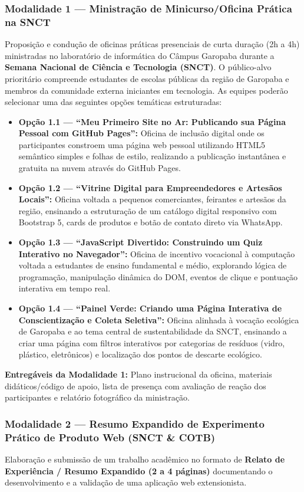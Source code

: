 \documentclass[12pt,a4paper]{article}
\begin{document}
\subsubsection*{Modalidade 1 — Ministração de Minicurso/Oficina Prática na SNCT}
Proposição e condução de oficinas práticas presenciais de curta duração (2h a 4h) ministradas no laboratório de informática do Câmpus Garopaba durante a \textbf{Semana Nacional de Ciência e Tecnologia (SNCT)}. O público-alvo prioritário compreende estudantes de escolas públicas da região de Garopaba e membros da comunidade externa iniciantes em tecnologia. As equipes poderão selecionar uma das seguintes opções temáticas estruturadas:

\begin{itemize}[leftmargin=*]
    \item \textbf{Opção 1.1 — ``Meu Primeiro Site no Ar: Publicando sua Página Pessoal com GitHub Pages'':} Oficina de inclusão digital onde os participantes constroem uma página web pessoal utilizando HTML5 semântico simples e folhas de estilo, realizando a publicação instantânea e gratuita na nuvem através do GitHub Pages.
    \item \textbf{Opção 1.2 — ``Vitrine Digital para Empreendedores e Artesãos Locais'':} Oficina voltada a pequenos comerciantes, feirantes e artesãos da região, ensinando a estruturação de um catálogo digital responsivo com Bootstrap 5, cards de produtos e botão de contato direto via WhatsApp.
    \item \textbf{Opção 1.3 — ``JavaScript Divertido: Construindo um Quiz Interativo no Navegador'':} Oficina de incentivo vocacional à computação voltada a estudantes de ensino fundamental e médio, explorando lógica de programação, manipulação dinâmica do DOM, eventos de clique e pontuação interativa em tempo real.
    \item \textbf{Opção 1.4 — ``Painel Verde: Criando uma Página Interativa de Conscientização e Coleta Seletiva'':} Oficina alinhada à vocação ecológica de Garopaba e ao tema central de sustentabilidade da SNCT, ensinando a criar uma página com filtros interativos por categorias de resíduos (vidro, plástico, eletrônicos) e localização dos pontos de descarte ecológico.
\end{itemize}
\textbf{Entregáveis da Modalidade 1:} Plano instrucional da oficina, materiais didáticos/código de apoio, lista de presença com avaliação de reação dos participantes e relatório fotográfico da ministração.

\subsubsection*{Modalidade 2 — Resumo Expandido de Experimento Prático de Produto Web (SNCT \& COTB)}
Elaboração e submissão de um trabalho acadêmico no formato de \textbf{Relato de Experiência / Resumo Expandido (2 a 4 páginas)} documentando o desenvolvimento e a validação de uma aplicação web extensionista. 
\end{document}
